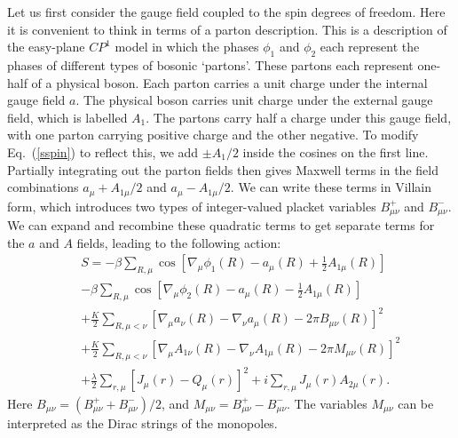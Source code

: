 \documentclass[prb,twocolumn]{revtex4-1}
\newcommand{\cp}{$CP^1$ }
\begin{document}
Let us first consider the gauge field coupled to the spin degrees of freedom. Here it is convenient to think in terms of a parton description. This is a description of the easy-plane \cp model in which the phases $\phi_1$ and $\phi_2$ each represent the phases of different types of bosonic `partons'. These partons each represent one-half of a physical boson. Each parton carries a unit charge under the internal gauge field $a$. The physical boson carries unit charge under the external gauge field, which is labelled $A_1$. The partons carry half a charge under this gauge field, with one parton carrying positive charge and the other negative.
To modify Eq.~(\ref{sspin}) to reflect this, we add $\pm A_1/2$ inside the cosines on the first line. 
Partially integrating out the parton fields then gives Maxwell terms in the field combinations $a_\mu+A_{1\mu}/2$ and $a_\mu-A_{1\mu}/2$. We can write these terms in Villain form, which introduces two types of integer-valued placket variables $B^+_{\mu\nu}$ and $B^-_{\mu\nu}$. We can expand and recombine these quadratic terms to get separate terms for the $a$ and $A$ fields, leading to the following action:
\begin{eqnarray}
&&S=-\beta\sum_{R,\mu} \cos[\nabla_\mu\phi_1(R)-a_\mu(R)+\frac{1}{2}A_{1\mu}(R)]\nonumber\\
&&-\beta\sum_{R,\mu} \cos[\nabla_\mu\phi_2(R)-a_\mu(R)-\frac{1}{2}A_{1\mu}(R)]\nonumber\\
&&+\frac{K}{2}\sum_{R,\mu<\nu}\left[\nabla_\mu a_\nu(R)-\nabla_\nu a_\mu(R)-2\pi B_{\mu\nu}(R)\right]^2\nonumber\\
&&+\frac{K}{2}\sum_{R,\mu<\nu}\left[\nabla_\mu A_{1\nu}(R)-\nabla_\nu A_{1\mu}(R)-2\pi M_{\mu\nu}(R)\right]^2\nonumber\\
&&+\frac{\lambda}{2}\sum_{r,\mu} [ J_\mu(r)- Q_\mu(r)]^2+i\sum_{r,\mu}J_{\mu}(r)A_{2\mu}(r).
\label{withA}
\end{eqnarray}
Here $B_{\mu\nu}=(B^+_{\mu\nu}+B^-_{\mu\nu})/2$, and $M_{\mu\nu}=B^+_{\mu\nu}-B^-_{\mu\nu}$. 
The variables $M_{\mu\nu}$ can be interpreted as the Dirac strings of the monopoles. 
\end{document}
